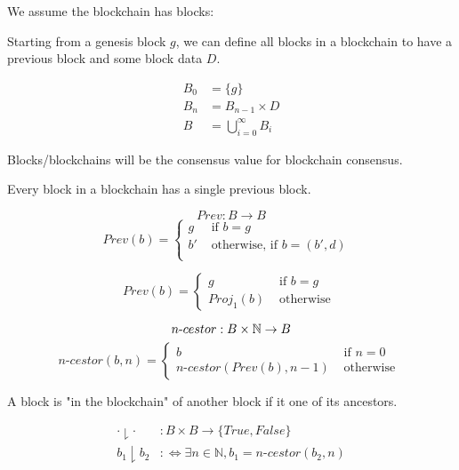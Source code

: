 \begin{defn}
We assume the blockchain has blocks:


Starting from a genesis block $g$, we can define all blocks in a blockchain to have a previous block and some block data $D$.

\begin{defn}[Blocks]
\begin{align*}
B_0 &= \{g\} \\
B_n &= B_{n-1} \times D \\
B &= \bigcup_{i = 0}^{\infty} B_i
\end{align*}
\end{defn}

Blocks/blockchains will be the consensus value for blockchain consensus.

Every block in a blockchain has a single previous block.

\begin{defn}
$$
Prev: B \to B
$$
\[ Prev(b) = \begin{cases}
  g  &\text{ if $b = g$ }\\
  b' &\text{ otherwise, if $b = (b', d)$ }\\
   \end{cases}
\]
\end{defn}

\[ Prev(b) = \left\{
\begin{array}{ll}
      g& \text{ if $b = g$ } \\
      Proj_1(b)& \text{ otherwise }
\end{array}
\right. \]


\begin{defn}
$$
n\text{-}cestor : B \times \mathbb{N} \to B\\
$$
\[ n\text{-}cestor(b, n) = \left\{
\begin{array}{ll}
      b& \text{ if $n = 0$ } \\
      n\text{-}cestor(Prev(b), n - 1)& \text{ otherwise }
\end{array}
\right. \]
\end{defn}


A block is "in the blockchain" of another block if it one of its ancestors.

\begin{defn}
\begin{align*}
\cdot \downharpoonright \cdot&: B \times B \to \{True, False\} \\
b_1 \downharpoonright b_2 &:\Leftrightarrow \exists n \in \mathbb{N}, b_1 = n\text{-}cestor(b_2, n)
\end{align*}
\end{defn}


\end{defn}
